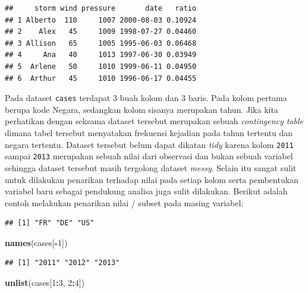 \documentclass[]{book}
\newenvironment{Shaded}{\begin{snugshade}}{\end{snugshade}}
\newcommand{\KeywordTok}[1]{\textcolor[rgb]{0.13,0.29,0.53}{\textbf{#1}}}
\newcommand{\DecValTok}[1]{\textcolor[rgb]{0.00,0.00,0.81}{#1}}
\newcommand{\OperatorTok}[1]{\textcolor[rgb]{0.81,0.36,0.00}{\textbf{#1}}}
\newcommand{\NormalTok}[1]{#1}
\begin{document}
\begin{verbatim}
##     storm wind pressure       date   ratio
## 1 Alberto  110     1007 2000-08-03 0.10924
## 2    Alex   45     1009 1998-07-27 0.04460
## 3 Allison   65     1005 1995-06-03 0.06468
## 4     Ana   40     1013 1997-06-30 0.03949
## 5  Arlene   50     1010 1999-06-11 0.04950
## 6  Arthur   45     1010 1996-06-17 0.04455
\end{verbatim}

Pada dataset \texttt{cases} terdapat 3 buah kolom dan 3 baris. Pada
kolom pertama berupa kode Negara, sedangkan kolom sisanya merupakan
tahun. Jika kita perhatikan dengan seksama dataset tersebut merupakan
sebuah \emph{contingency table} dimana tabel tersebut menyatakan
frekuensi kejadian pada tahun tertentu dan negara tertentu. Dataset
tersebut belum dapat dikatan \emph{tidy} karena kolom \texttt{2011}
sampai \texttt{2013} merupakan sebuah nilai dari observasi dan bukan
sebuah variabel sehingga dataset tersebut masih tergolong dataset
\emph{messy}. Selain itu sangat sulit untuk dilakukan penarikan terhadap
nilai pada setiap kolom serta pembentukan variabel baru sebagai
pendukung analisa juga sulit dilakukan. Berikut adalah contoh melakukan
penarikan nilai / subset pada masing variabel:

\begin{Shaded}
\end{Shaded}

\begin{verbatim}
## [1] "FR" "DE" "US"
\end{verbatim}

\begin{Shaded}
\begin{Highlighting}[]
\KeywordTok{names}\NormalTok{(cases[}\OperatorTok{-}\DecValTok{1}\NormalTok{])}
\end{Highlighting}
\end{Shaded}

\begin{verbatim}
## [1] "2011" "2012" "2013"
\end{verbatim}

\begin{Shaded}
\begin{Highlighting}[]
\KeywordTok{unlist}\NormalTok{(cases[}\DecValTok{1}\OperatorTok{:}\DecValTok{3}\NormalTok{, }\DecValTok{2}\OperatorTok{:}\DecValTok{4}\NormalTok{])}
\end{Highlighting}
\end{Shaded}
\end{document}
